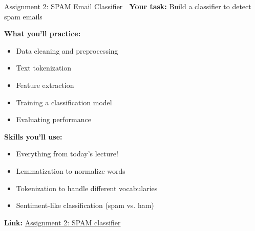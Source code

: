 \documentclass[aspectratio=169]{beamer}
\begin{document}
\begin{frame}[shrink=10]{Assignment 2: SPAM Email Classifier 📧}
    \textbf{Your task:} Build a classifier to detect spam emails

    \vspace{0.5em}
    \textbf{What you'll practice:}
    \begin{itemize}\setlength{\itemsep}{0pt}
        \item Data cleaning and preprocessing
        \item Text tokenization
        \item Feature extraction
        \item Training a classification model
        \item Evaluating performance
    \end{itemize}

    \vspace{0.5em}
    \textbf{Skills you'll use:}
    \begin{itemize}\setlength{\itemsep}{0pt}
        \item Everything from today's lecture!
        \item Lemmatization to normalize words
        \item Tokenization to handle different vocabularies
        \item Sentiment-like classification (spam vs. ham)
    \end{itemize}

    \vspace{0.5em}
    \textbf{Link:} \href{https://github.com/ContextLab/llm-course/tree/main/assignments/Assignment\%202\%3A\%20SPAM\%20classifier}{Assignment 2: SPAM classifier}
\end{frame}
\end{document}
